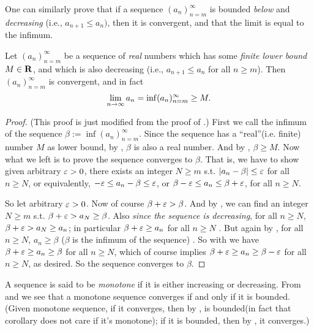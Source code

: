 \begin{note}
One can similarly prove that if a sequence \((a_n)_{n = m}^{\infty}\) is bounded \emph{below} and \emph{decreasing} (i.e., \(a_{n + 1} \le a_n)\), then it is convergent, and that the limit is equal to the infimum.
\end{note}

\begin{additional corollary} \label{ac 6.3.2}
Let \((a_n)_{n = m}^{\infty}\) be a sequence of \emph{real} numbers which has some \emph{finite lower bound} \(M \in \mathbf{R}\), and which is also decreasing (i.e., \(a_{n + 1} \leq a_n\) for all \(n \ge m\)).
Then \((a_n)_{n = m}^\infty\) is convergent, and in fact
\[
    \lim_{n \to \infty} a_n = \inf(a_n)_{n = m}^\infty \ge M.
\]
\end{additional corollary}

\begin{proof} (This proof is just modified from the proof of .)
First we call the infimum of the sequence \(\beta := \inf(a_n)_{n = m}^{\infty}\).
Since the sequence has a ``real''(i.e. finite) number \(M\) as lower bound, by , \(\beta\) is also a real number.
And by , \(\beta \ge M\).
Now what we left is to prove the sequence converges to \(\beta\).
That is, we have to show given arbitrary \(\varepsilon > 0\), there exists an integer \(N \ge m\) s.t. \(\lvert a_n - \beta\rvert \le \varepsilon\) for all \(n \ge N\), or equivalently, \(-\varepsilon \le a_n - \beta \le \varepsilon\), or \(\beta - \varepsilon \le a_n \le \beta + \varepsilon\), for all \(n \ge N\).

So let arbitrary \(\varepsilon > 0\).
Now of course \(\beta + \varepsilon > \beta\).
And by , we can find an integer \(N \ge m\) s.t. \(\beta + \varepsilon > a_N \ge \beta\).
Also \emph{since the sequence is decreasing}, for all \(n \ge N\), \(\beta + \varepsilon > a_N \ge a_n\);
in particular \(\beta + \varepsilon \ge a_n\) for all \(n \ge N\) .
But again by , for all \(n \ge N\), \(a_n \ge \beta\) (\(\beta\) is the infimum of the sequence) .
So with  we have \(\beta + \varepsilon \ge a_n \ge \beta\) for all \(n \ge N\), which of course implies \(\beta + \varepsilon \ge a_n \ge \beta - \varepsilon\) for all \(n \ge N\), as desired.
So the sequence converges to \(\beta\).
\end{proof}

\begin{note}
A sequence is said to be \emph{monotone} if it is either increasing or decreasing.
From  and  we see that a
monotone sequence converges if and only if it is bounded.
(Given monotone sequence, if it converges, then by , is bounded(in fact that corollary does not care if it's monotone); if it is bounded, then by , it converges.)
\end{note}

